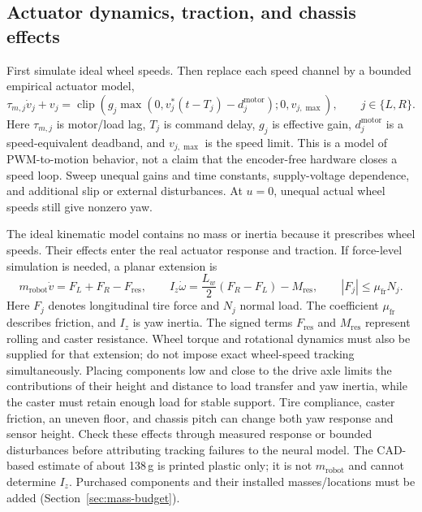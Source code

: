 \subsection{Actuator dynamics, traction, and chassis effects}
First simulate ideal wheel speeds. Then replace each speed channel by a bounded empirical actuator model,
\begin{equation}
 \tau_{m,j}\dot v_j+v_j=
 \operatorname{clip}\!\left(
  g_j\max(0,v_j^*(t-T_j)-d_j^{\mathrm{motor}});
  0,v_{j,\max}\right),\qquad j\in\{L,R\}.
 \label{eq:wheel-lag}
\end{equation}
Here $\tau_{m,j}$ is motor/load lag, $T_j$ is command delay, $g_j$ is effective gain, $d_j^{\mathrm{motor}}$ is a speed-equivalent deadband, and $v_{j,\max}$ is the speed limit. This is a model of PWM-to-motion behavior, not a claim that the encoder-free hardware closes a speed loop. Sweep unequal gains and time constants, supply-voltage dependence, and additional slip or external disturbances. At $u=0$, unequal actual wheel speeds still give nonzero yaw.

The ideal kinematic model contains no mass or inertia because it prescribes wheel speeds. Their effects enter the real actuator response and traction. If force-level simulation is needed, a planar extension is
\begin{equation}
 m_{\mathrm{robot}}\dot v=F_L+F_R-F_{\mathrm{res}},\qquad
 I_z\dot\omega=\frac{L_w}{2}(F_R-F_L)-M_{\mathrm{res}},\qquad
 |F_j|\le\mu_{\mathrm{fr}}N_j.
 \label{eq:force-mechanics}
\end{equation}
Here $F_j$ denotes longitudinal tire force and $N_j$ normal load. The coefficient $\mu_{\mathrm{fr}}$ describes friction, and $I_z$ is yaw inertia. The signed terms $F_{\mathrm{res}}$ and $M_{\mathrm{res}}$ represent rolling and caster resistance. Wheel torque and rotational dynamics must also be supplied for that extension; do not impose exact wheel-speed tracking simultaneously. Placing components low and close to the drive axle limits the contributions of their height and distance to load transfer and yaw inertia, while the caster must retain enough load for stable support. Tire compliance, caster friction, an uneven floor, and chassis pitch can change both yaw response and sensor height. Check these effects through measured response or bounded disturbances before attributing tracking failures to the neural model. The CAD-based estimate of about 138\,g is printed plastic only; it is not $m_{\mathrm{robot}}$ and cannot determine $I_z$. Purchased components and their installed masses/locations must be added (Section~\ref{sec:mass-budget}).

